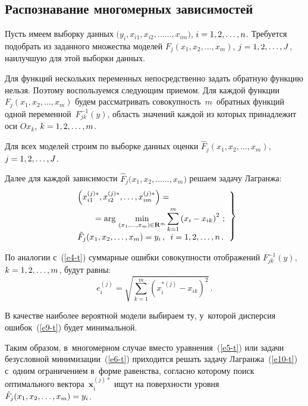 \begin{multicols}{2}
\subsection{Распознавание многомерных зависимостей}

  Пусть имеем выборку данных $(y_i, x_{i1}, x_{i2}, \ldots$\linebreak $\ldots , x_{im})$, $i\hm= 
1,2,\ldots ,n$. Требуется подобрать из заданного множества моделей $F_j(x_1, 
x_2, \ldots, x_m)$, $j\hm=1,2,\ldots ,J$, наилучшую для этой выборки данных.
  
  Для функций нескольких переменных непосредственно задать обратную 
функцию нельзя. Поэтому воспользуемся следующим приемом. Для каждой 
функции $F_j (x_1, x_2, \ldots ,x_m)$ будем рас\-смат\-ри\-вать 
совокупность~$m$~обратных функций одной переменной~$F_{jk}^{-1}(y)$, 
область значений каждой из которых принадлежит оси $Ox_k$, $k\hm=1,2,\ldots 
,m$.
  
  Для всех моделей строим по выборке данных оценки $\hat{F}_j (x_1,x_2, 
\ldots,x_m)$, $j\hm= 1,2,\ldots, J$.
  
  Далее для каждой зависимости $\hat{F}_j (x_1, x_2, \ldots$\linebreak $\ldots, x_m)$ решаем 
  задачу Лагранжа:
  \begin{equation}
  \left.
  \begin{array}{l}
  \left( x_{i1}^{(j)*}, x_{i2}^{(j)*}, \ldots, x_{im}^{(j)*}\right) ={}\\[6pt]
  \hspace*{6.5mm}{}=\mathrm{arg}\, 
\min\limits_{(x_1,\ldots, x_m)\in \mathbf{R}^m}\displaystyle
 \sum\limits_{k=1}^m \left(x_i-
x_{ik}\right)^2\,;\\[6pt]
  \hat{F}_j(x_1,x_2,\ldots, x_m) =y_i\,,\enskip i=1,2,\ldots, n\,.
  \end{array}
  \right\}
  \label{e10-t}
  \end{equation}
  
  По аналогии с~(\ref{e4-t}) суммарные ошибки совокупности отображений 
$F^{-1}_{jk}(y)$, $k\hm= 1,2,\ldots, m$, будут равны: 
  $$
  e_i^{(j)} =\sqrt{\sum\limits_{k=1}^m \left( x_i^{*(j)} - x_{ik}\right)^2}\,.
  $$
  
  В качестве наиболее вероятной модели выбираем ту, у~которой дисперсия 
ошибок~(\ref{e9-t}) будет минимальной.
  
  Таким образом, в~многомерном случае вместо уравнения~(\ref{e5-t}) или 
задачи безусловной минимизации~(\ref{e6-t}) приходится решать задачу 
Лагранжа~(\ref{e10-t}) с~одним ограничением в~форме равенства, согласно 
которому поиск оптимального вектора~$\mathbf{x}_i^{(j)*}$ ищут на 
поверхности уровня $\hat{F}_j (x_1, x_2, \ldots, x_m) \hm=y_i$.
  

\end{multicols}
